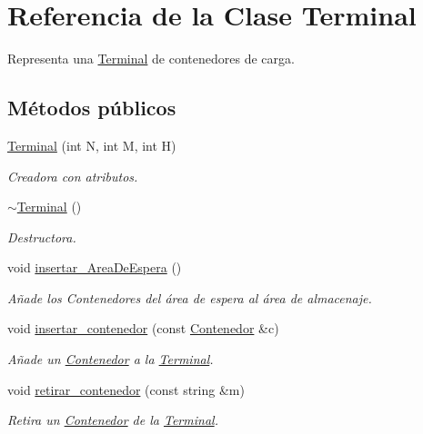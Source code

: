 \hypertarget{class_terminal}{}\section{Referencia de la Clase Terminal}
\label{class_terminal}


Representa una \hyperlink{class_terminal}{Terminal} de contenedores de carga.  


\subsection*{Métodos públicos}
\begin{DoxyCompactItemize}
\item 
\hyperlink{class_terminal_a696ee89f0fc7359b528c9f8f2aec064f}{Terminal} (int N, int M, int H)
\begin{DoxyCompactList}\small\item\em Creadora con atributos. \end{DoxyCompactList}\item 
\hyperlink{class_terminal_add5a7d4dd45b68af9a0afb1cc845af2f}{$\sim$\+Terminal} ()
\begin{DoxyCompactList}\small\item\em Destructora. \end{DoxyCompactList}\item 
void \hyperlink{class_terminal_a672932def16149bd23a95d60956e42a0}{insertar\+\_\+\+Area\+De\+Espera} ()
\begin{DoxyCompactList}\small\item\em Añade los Contenedores del área de espera al área de almacenaje. \end{DoxyCompactList}\item 
void \hyperlink{class_terminal_a0448a45cc3dea91ab383c79246c9e50e}{insertar\+\_\+contenedor} (const \hyperlink{class_contenedor}{Contenedor} \&c)
\begin{DoxyCompactList}\small\item\em Añade un \hyperlink{class_contenedor}{Contenedor} a la \hyperlink{class_terminal}{Terminal}. \end{DoxyCompactList}\item 
void \hyperlink{class_terminal_a4a5b00174efb9993ead60369d206375b}{retirar\+\_\+contenedor} (const string \&m)
\begin{DoxyCompactList}\small\item\em Retira un \hyperlink{class_contenedor}{Contenedor} de la \hyperlink{class_terminal}{Terminal}. \end{DoxyCompactList}\item 

\end{DoxyCompactItemize}
